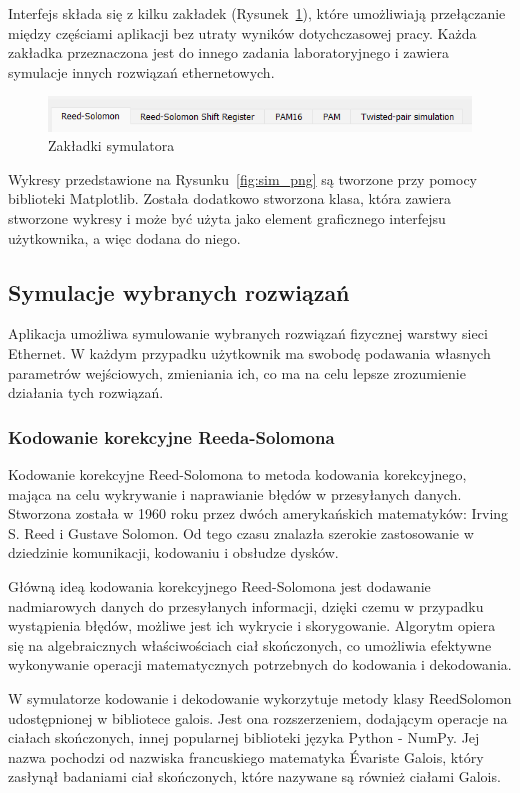 Interfejs składa się z kilku zakładek (Rysunek~\ref{fig:zakladki_sim_image}), które umożliwiają przełączanie między częściami aplikacji bez utraty wyników dotychczasowej pracy. Każda zakładka przeznaczona jest do innego zadania laboratoryjnego i zawiera symulacje innych rozwiązań ethernetowych.

\begin{figure}[H]
    \centering
    \includegraphics{images/zakladki.png}
    \caption{Zakładki symulatora}
    \label{fig:zakladki_sim_image}
\end{figure}

Wykresy przedstawione na Rysunku~\ref{fig:sim_png} są tworzone przy pomocy biblioteki Matplotlib. Została dodatkowo stworzona klasa, która zawiera stworzone wykresy i może być użyta jako element graficznego interfejsu użytkownika, a więc dodana do niego.

\subsection{Symulacje wybranych rozwiązań}
Aplikacja umożliwa symulowanie wybranych rozwiązań fizycznej warstwy sieci Ethernet. W każdym przypadku użytkownik ma swobodę podawania własnych parametrów wejściowych, zmieniania ich, co ma na celu lepsze zrozumienie działania tych rozwiązań.

\subsubsection{Kodowanie korekcyjne Reeda-Solomona}
Kodowanie korekcyjne Reed-Solomona to metoda kodowania korekcyjnego, mająca na celu wykrywanie i naprawianie błędów w przesyłanych danych. Stworzona została w 1960 roku przez dwóch amerykańskich matematyków: Irving S. Reed i Gustave Solomon. Od tego czasu znalazła szerokie zastosowanie w dziedzinie komunikacji, kodowaniu i obsłudze dysków.

Główną ideą kodowania korekcyjnego Reed-Solomona jest dodawanie nadmiarowych danych do przesyłanych informacji, dzięki czemu w przypadku wystąpienia błędów, możliwe jest ich wykrycie i skorygowanie. Algorytm opiera się na algebraicznych właściwościach ciał skończonych, co umożliwia efektywne wykonywanie operacji matematycznych potrzebnych do kodowania i dekodowania.

W symulatorze kodowanie i dekodowanie wykorzytuje metody klasy ReedSolomon udostępnionej w bibliotece galois. Jest ona rozszerzeniem, dodającym operacje na ciałach skończonych, innej popularnej biblioteki języka Python - NumPy. Jej nazwa pochodzi od nazwiska francuskiego matematyka Évariste Galois, który zasłynął badaniami ciał skończonych, które nazywane są również ciałami Galois.

